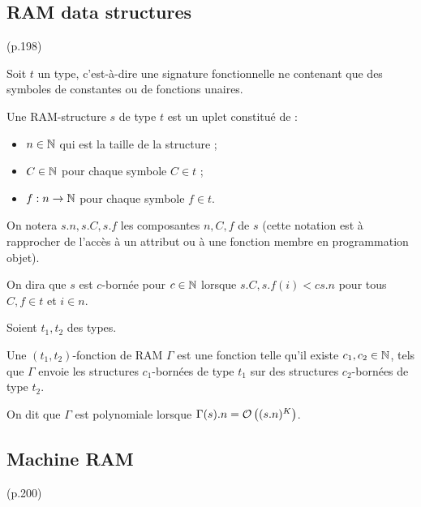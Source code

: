 \documentclass{report}
\begin{document}
		\subsection{RAM data structures} (p.198)
			\label{sec:RAM_data_structures}

		\begin{definition}
			\label{def:RAM_data_structures}
			Soit $t$ un type, c'est-à-dire une signature fonctionnelle ne contenant que des symboles de constantes ou de fonctions unaires.
			
			Une RAM-structure $s$ de type $t$ est un uplet constitué de :
			\begin{itemize}[itemsep=-1mm]
				\item 	$n \in \mathbb{N}$ qui est la taille de la structure ;
				\item 	$C \in \mathbb{N}$ pour chaque symbole $C \in t$ ;
				\item 	$f : n \to \mathbb{N}$ pour chaque symbole $f \in t$.
			\end{itemize}
			
			On notera $s.n, s.C, s.f$ les composantes $n, C, f$ de $s$ (cette notation est à rapprocher de l'accès à un attribut ou à une fonction membre en programmation objet).
			
			On dira que $s$ est $c$-bornée pour $c\in\mathbb{N}$ lorsque $s.C, s.f(i) < c s.n$ pour tous $C, f \in t$ et $i \in n$.
		\end{definition}
	
	
		\begin{definition}
			\label{def:fonction_de_RAM}
			Soient $t_1, t_2$ des types. 
			
			Une $(t_1, t_2)$-fonction de RAM $\Gamma$ est une fonction telle qu'il existe $c_1, c_2 \in \mathbb{N}$, tels que $\Gamma$ envoie les structures $c_1$-bornées de type $t_1$ sur des structures $c_2$-bornées de type $t_2$\footnotemark.
			
			
			On dit que $\Gamma$ est polynomiale lorsque $\Gamma(s).n = \mathcal{O}\left( (s.n)^K \right)$.
			
		\end{definition}
	
	
	
		\subsection{Machine RAM} (p.200)
			\label{subsec:machine_RAM}
		
\end{document}

